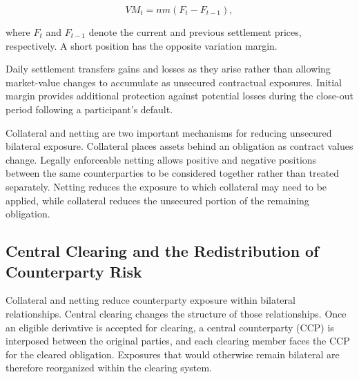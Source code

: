 \begin{equation}
VM_t=nm(F_t-F_{t-1}),
\label{eq:ch11-daily-variation-margin}
\end{equation}

where $F_t$ and $F_{t-1}$ denote the current and
previous settlement prices, respectively. A short
position has the opposite variation margin.

Daily settlement transfers gains and losses as
they arise rather than allowing market-value
changes to accumulate as unsecured contractual
exposures. Initial margin provides additional
protection against potential losses during the
close-out period following a participant's default.

Collateral and netting are two important mechanisms for reducing unsecured bilateral exposure. Collateral places assets behind an obligation as contract values change. Legally enforceable netting allows positive and negative positions between the same counterparties to be considered together rather than treated separately. Netting reduces the exposure to which collateral may need to be applied, while collateral reduces the unsecured portion of the remaining obligation.

\subsection{Central Clearing and the Redistribution of Counterparty Risk}

Collateral and netting reduce counterparty exposure within bilateral relationships. Central clearing changes the structure of those relationships. Once an eligible derivative is accepted for clearing, a central counterparty (CCP) is interposed between the original parties, and each clearing member faces the CCP for the cleared obligation. Exposures that would otherwise remain bilateral are therefore reorganized within the clearing system.

